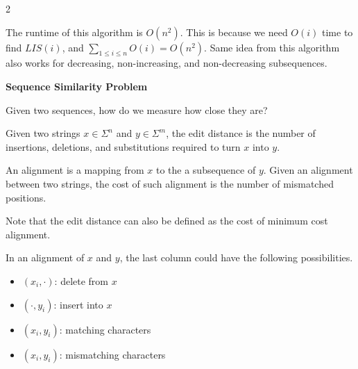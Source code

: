 \begin{multicols}{2}
\begin{analysis}
    The runtime of this algorithm is $O(n^2)$. This is because we need $O(i)$ time to find $LIS(i)$, and $\sum_{1\leq i \leq n}O(i) = O(n^2)$. Same idea from this algorithm also works for decreasing, non-increasing, and non-decreasing subsequences. 
\end{analysis}
\begin{leftbar}
    \textbf{Sequence Similarity Problem}
    
    Given two sequences, how do we measure how close they are? 
\end{leftbar}
\begin{definition}
    Given two strings $x\in \Sigma^n$ and $y \in \Sigma^m$, the edit distance is the number of insertions, deletions, and substitutions required to turn $x$ into $y$. 
\end{definition}
\begin{definition}
    An alignment is a mapping from $x$ to the a subsequence of $y$. Given an alignment between two strings, the cost of such alignment is the number of mismatched positions. 
\end{definition}
Note that the edit distance can also be defined as the cost of minimum cost alignment. 

\begin{analysis}
    In an alignment of $x$ and $y$, the last column could have the following possibilities. 
    \begin{itemize}
        \item $(x_i, \cdot)$: delete from $x$
        \item $(\cdot, y_i)$: insert into $x$
        \item $(x_i, y_i)$: matching characters
        \item $(x_i, y_i)$: mismatching characters
    \end{itemize}


\end{analysis}
\end{multicols}
